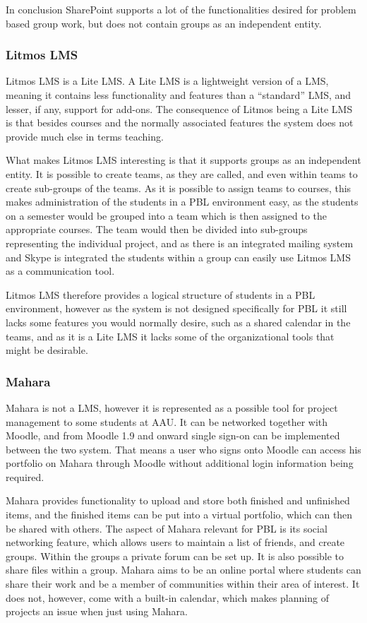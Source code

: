 In conclusion SharePoint supports a lot of the functionalities desired for problem based group work, but does not contain groups as an independent entity.

\subsubsection{Litmos LMS}
Litmos LMS \citep{litmos} is a Lite LMS.
A Lite LMS is a lightweight version of a LMS, meaning it contains less functionality and features than a ``standard'' LMS, and lesser, if any, support for add-ons.
The consequence of Litmos being a Lite LMS is that besides courses and the normally associated features the system does not provide much else in terms teaching.

What makes Litmos LMS interesting is that it supports groups as an independent entity.
It is possible to create teams, as they are called, and even within teams to create sub-groups of the teams.
As it is possible to assign teams to courses, this makes administration of the students in a PBL environment easy, as the students on a semester would be grouped into a team which is then assigned to the appropriate courses.
The team would then be divided into sub-groups representing the individual project, and as there is an integrated mailing system and Skype is integrated the students within a group can easily use Litmos LMS as a communication tool. 

Litmos LMS therefore provides a logical structure of students in a PBL environment, however as the system is not designed specifically for PBL it still lacks some features you would normally desire, such as a shared calendar in the teams, and as it is a Lite LMS it lacks some of the organizational tools that might be desirable.

\subsubsection{Mahara}
Mahara is not a LMS, however it is represented as a possible tool for project management to some students at AAU.
It can be networked together with Moodle, and from Moodle 1.9 and onward single sign-on can be implemented between the two system.
That means a user who signs onto Moodle can access his portfolio on Mahara through Moodle without additional login information being required.

Mahara provides functionality to upload and store both finished and unfinished items, and the finished items can be put into a virtual portfolio, which can then be shared with others.
The aspect of Mahara relevant for PBL is its social networking feature, which allows users to maintain a list of friends, and create groups.
Within the groups a private forum can be set up. 
It is also possible to share files within a group.
Mahara aims to be an online portal where students can share their work and be a member of communities within their area of interest.
It does not, however, come with a built-in calendar, which makes planning of projects an issue when just using Mahara.

